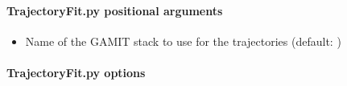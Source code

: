 \documentclass[letterpaper,10pt,english]{sphinxmanual}
\begin{document}
\paragraph{TrajectoryFit.py positional arguments}
\label{\detokenize{com:TrajectoryFit.py-positional-arguments}}\begin{itemize}
\item {} 
\sphinxAtStartPar
{\hyperref[\detokenize{com:TrajectoryFit.py-_stack-name_}]{}} \sphinxhyphen{} Name of the GAMIT stack to use for the trajectories (default: )

\end{itemize}


\paragraph{TrajectoryFit.py options}
\end{document}
